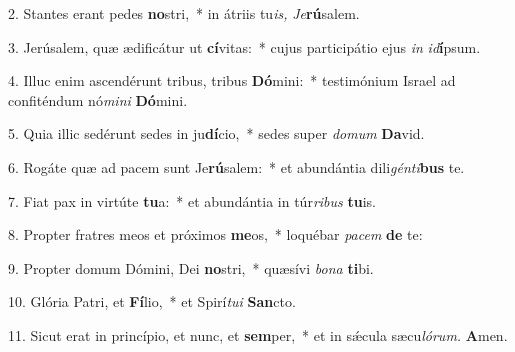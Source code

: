 \item 2. Stantes erant pedes \textbf{no}stri,~* in átriis tu\textit{is,} \textit{Je}\textbf{rú}salem.
\item 3. Jerúsalem, quæ ædificátur ut \textbf{cí}vitas:~* cujus participátio ejus \textit{in} \textit{id}\textbf{í}psum.
\item 4. Illuc enim ascendérunt tribus, tribus \textbf{Dó}mini:~* testimónium Israel ad confiténdum nó\textit{mini} \textbf{Dó}mini.
\item 5. Quia illic sedérunt sedes in ju\textbf{dí}cio,~* sedes super \textit{domum} \textbf{Da}vid.
\item 6. Rogáte quæ ad pacem sunt Je\textbf{rú}salem:~* et abundántia dili\textit{génti}\textbf{bus} te.
\item 7. Fiat pax in virtúte \textbf{tu}a:~* et abundántia in túr\textit{ribus} \textbf{tu}is.
\item 8. Propter fratres meos et próximos \textbf{me}os,~* loquébar \textit{pacem} \textbf{de} te:
\item 9. Propter domum Dómini, Dei \textbf{no}stri,~* quæsívi \textit{bona} \textbf{ti}bi.
\item 10. Glória Patri, et \textbf{Fí}lio,~* et Spirí\hspace{0.03em}\textit{tui} \textbf{San}cto.
\item 11. Sicut erat in princípio, et nunc, et \textbf{sem}per,~* et in sǽcula sæcu\hspace{0.03em}\textit{lórum.} \textbf{A}men.
